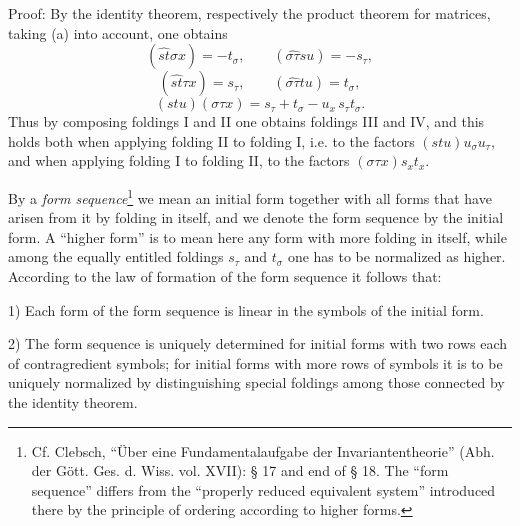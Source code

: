 \documentclass[11pt]{article}
\begin{document}
Proof: By the identity theorem, respectively the product theorem for matrices, taking (a) into account, one obtains
\[
(\widehat{st}\sigma x)=-t_\sigma,\qquad
(\widehat{\sigma\tau}su)=-s_\tau,
\]
\[
(\widehat{st}\tau x)=s_\tau,\qquad
(\widehat{\sigma\tau}tu)=t_\sigma,
\]
\[
(stu)(\sigma\tau x)=s_\tau+t_\sigma-u_x\,s_\tau t_\sigma .
\]
Thus by composing foldings I and II one obtains foldings III and IV, and this holds both when applying folding II to folding I, i.e. to the factors $(stu)u_\sigma u_\tau$, and when applying folding I to folding II, to the factors $(\sigma\tau x)s_xt_x$.

By a \emph{form sequence}\footnote{Cf. Clebsch, ``Über eine Fundamentalaufgabe der Invariantentheorie'' (Abh. der Gött. Ges. d. Wiss. vol. XVII): § 17 and end of § 18. The ``form sequence'' differs from the ``properly reduced equivalent system'' introduced there by the principle of ordering according to higher forms.} we mean an initial form together with all forms that have arisen from it by folding in itself, and we denote the form sequence by the initial form. A ``higher form'' is to mean here any form with more folding in itself, while among the equally entitled foldings $s_\tau$ and $t_\sigma$ one has to be normalized as higher. According to the law of formation of the form sequence it follows that:

1) Each form of the form sequence is linear in the symbols of the initial form.

2) The form sequence is uniquely determined for initial forms with two rows each of contragredient symbols; for initial forms with more rows of symbols it is to be uniquely normalized by distinguishing special foldings among those connected by the identity theorem.
\end{document}
